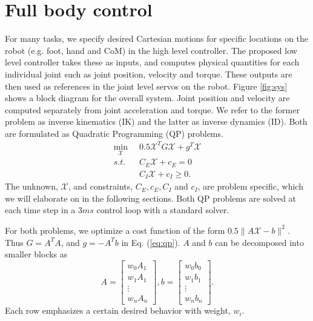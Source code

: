 \documentclass{ws-ijhr}
\newcommand{\eref}[1] {Eq. (\ref{#1})}
\newcommand{\fref}[1] {Figure \ref{#1}}
\newcommand{\QPx}{\mathcal{X}}
\begin{document}

\section{Full body control}
\label{sec:fbc}
For many tasks, we specify desired Cartesian motions for specific locations on 
the robot (e.g. foot, hand and CoM) in the high level controller. 
The proposed low level controller takes these as inputs, and computes physical 
quantities for each individual joint such as joint position, velocity and torque. 
These outputs are then used as references in the joint
level servos on the robot. \fref{fig:sys} shows a block diagram for the overall 
system. Joint position and velocity are computed separately 
from joint acceleration and torque. We refer to the former problem as inverse 
kinematics (IK) and the latter as inverse dynamics (ID). Both are formulated as 
Quadratic Programming (QP) problems. 
\begin{equation}
  \begin{split}
  \min_{\QPx}\;\; & 0.5\QPx^TG\QPx + g^T\QPx \\
  s.t.\;\; & C_E\QPx + c_E = 0 \\
  & C_I\QPx + c_I \geq 0.
  \end{split}
	\label{eq:qp}
\end{equation} 
The unknown, ${\QPx}$, and constraints, $C_E, c_E, C_I$ and $c_I$, are problem specific,
which we will elaborate on in the following sections. Both QP problems are solved at 
each time step in a 3$ms$ control loop with a standard solver. 

For both problems, we optimize a cost function of the form $0.5\|A\QPx-b\|^2$. 
Thus $G = A^TA$, and $g = -A^Tb$ in \eref{eq:qp}.
$A$ and $b$ can be decomposed into smaller blocks as 
\begin{equation}
  A = \begin{bmatrix} w_0A_1 \\ w_1 A_1 \\ \vdots \\ w_nA_n \end{bmatrix},
  b = \begin{bmatrix} w_0b_0 \\ w_1 b_1 \\ \vdots \\ w_nb_n \end{bmatrix}.
  \label{eq:cost}
\end{equation}
Each row emphasizes a certain desired behavior with weight, $w_i$.
\end{document}
